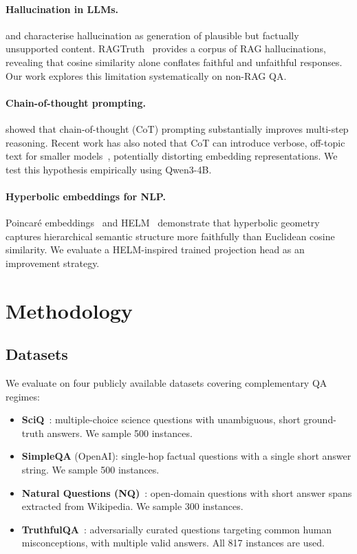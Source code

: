 \documentclass[11pt,a4paper]{article}
\begin{document}
\paragraph{Hallucination in LLMs.}
\citet{maynez2020faithfulness} and \citet{ji2023survey} characterise hallucination
as generation of plausible but factually unsupported content.
RAGTruth~\citep{wu2023ragtruth} provides a corpus of RAG hallucinations, revealing
that cosine similarity alone conflates faithful and unfaithful responses.
Our work explores this limitation systematically on non-RAG QA.

\paragraph{Chain-of-thought prompting.}
\citet{wei2022chain} showed that chain-of-thought (CoT) prompting substantially
improves multi-step reasoning.
Recent work has also noted that CoT can introduce verbose, off-topic text for smaller
models~\citep{kojima2022large}, potentially distorting embedding representations.
We test this hypothesis empirically using Qwen3-4B.

\paragraph{Hyperbolic embeddings for NLP.}
Poincar\'{e} embeddings~\citep{nickel2017poincare} and HELM~\citep{he2025helm}
demonstrate that hyperbolic geometry captures hierarchical semantic structure more
faithfully than Euclidean cosine similarity.
We evaluate a HELM-inspired trained projection head as an improvement strategy.

\section{Methodology}
\label{sec:method}

\subsection{Datasets}

We evaluate on four publicly available datasets covering complementary QA regimes:

\begin{itemize}[nosep]
  \item \textbf{SciQ}~\citep{welbl2017sciq}: multiple-choice science questions with
        unambiguous, short ground-truth answers.  We sample 500 instances.
  \item \textbf{SimpleQA} (OpenAI): single-hop factual questions with a single
        short answer string.  We sample 500 instances.
  \item \textbf{Natural Questions (NQ)}~\citep{kwiatkowski2019nq}: open-domain
        questions with short answer spans extracted from Wikipedia.
        We sample 300 instances.
  \item \textbf{TruthfulQA}~\citep{lin2021truthfulqa}: adversarially curated
        questions targeting common human misconceptions, with multiple valid
        answers.  All 817 instances are used.
\end{itemize}
\end{document}
